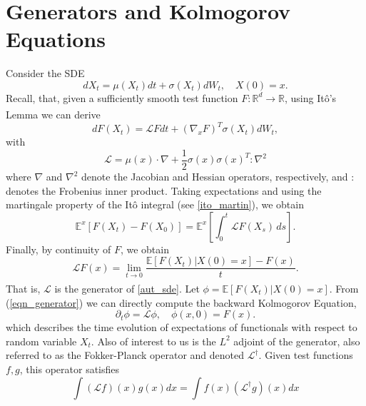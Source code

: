 \documentclass[11pt, twoside]{report}
\begin{document}
\section{Generators and Kolmogorov Equations}
Consider the SDE
\begin{equation} \label{aut_sde}
    dX_t = \mu(X_t) dt + \sigma(X_t) dW_t, \quad X(0) = x.
\end{equation}
Recall, that, given a sufficiently smooth test function $F: \mathbb{R}^d \xrightarrow[]{} \mathbb{R}$, using It\^{o}'s Lemma we can derive
\begin{equation} \label{ito_lem_gen}
    dF(X_t) = \mathcal{L}F dt + (\nabla_x F)^T \sigma(X_t) dW_t,
\end{equation}
with
\begin{equation} \label{generator_explicit}
    \mathcal{L} = \mu(x) \cdot \nabla + \frac{1}{2}\sigma(x)\sigma(x)^T : \nabla^2
\end{equation}
 where $\nabla$ and $\nabla^2$ denote the Jacobian and Hessian operators, respectively, and $:$ denotes the Frobenius inner product. Taking expectations and using the martingale property of the It\^{o} integral (see \eqref{ito_martin}), we obtain
\begin{equation}
\mathbb{E}^x\!\left[F(X_t) - F(X_0)\right] = \mathbb{E}^x\!\left[\int_0^t \mathcal{L}F(X_s)\, ds \right]. \label{generator_martin}
\end{equation} 
Finally, by continuity of $F$, we obtain
\begin{equation} \label{eqn_generator}
    \mathcal{L}F(x) = \lim_{t \xrightarrow[]{} 0}\frac{\mathbb{E}\left[F(X_t) | X(0) = x \right]- F(x)}{t}.
\end{equation}
That is, $\mathcal{L}$ is the generator of \ref{aut_sde}. Let $\phi = \mathbb{E}\left[F(X_t) | X(0) = x \right]$. From (\ref{eqn_generator}) we can directly compute the backward Kolmogorov Equation,
\begin{equation} \label{eqn_BKE}
    \partial_t \phi = \mathcal{L} \phi, \quad \phi(x,0) = F(x).
\end{equation}
which describes the time evolution of expectations of functionals with respect to random variable $X_t$. Also of interest to us is the $L^2$ adjoint of the generator, also referred to as the Fokker-Planck operator and denoted $\mathcal{L}^{\dagger}$. Given test functions $f,g$, this operator satisfies
\begin{equation}
    \int (\mathcal{L}f)(x)g(x) dx = \int f(x)(\mathcal{L}^{\dagger}g)(x) dx
\end{equation}
\end{document}
